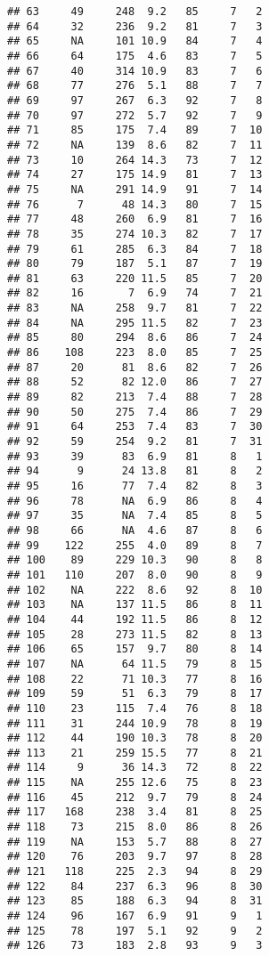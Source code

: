 \documentclass[
]{article}
\begin{document}
\begin{verbatim}
## 63     49     248  9.2   85     7   2
## 64     32     236  9.2   81     7   3
## 65     NA     101 10.9   84     7   4
## 66     64     175  4.6   83     7   5
## 67     40     314 10.9   83     7   6
## 68     77     276  5.1   88     7   7
## 69     97     267  6.3   92     7   8
## 70     97     272  5.7   92     7   9
## 71     85     175  7.4   89     7  10
## 72     NA     139  8.6   82     7  11
## 73     10     264 14.3   73     7  12
## 74     27     175 14.9   81     7  13
## 75     NA     291 14.9   91     7  14
## 76      7      48 14.3   80     7  15
## 77     48     260  6.9   81     7  16
## 78     35     274 10.3   82     7  17
## 79     61     285  6.3   84     7  18
## 80     79     187  5.1   87     7  19
## 81     63     220 11.5   85     7  20
## 82     16       7  6.9   74     7  21
## 83     NA     258  9.7   81     7  22
## 84     NA     295 11.5   82     7  23
## 85     80     294  8.6   86     7  24
## 86    108     223  8.0   85     7  25
## 87     20      81  8.6   82     7  26
## 88     52      82 12.0   86     7  27
## 89     82     213  7.4   88     7  28
## 90     50     275  7.4   86     7  29
## 91     64     253  7.4   83     7  30
## 92     59     254  9.2   81     7  31
## 93     39      83  6.9   81     8   1
## 94      9      24 13.8   81     8   2
## 95     16      77  7.4   82     8   3
## 96     78      NA  6.9   86     8   4
## 97     35      NA  7.4   85     8   5
## 98     66      NA  4.6   87     8   6
## 99    122     255  4.0   89     8   7
## 100    89     229 10.3   90     8   8
## 101   110     207  8.0   90     8   9
## 102    NA     222  8.6   92     8  10
## 103    NA     137 11.5   86     8  11
## 104    44     192 11.5   86     8  12
## 105    28     273 11.5   82     8  13
## 106    65     157  9.7   80     8  14
## 107    NA      64 11.5   79     8  15
## 108    22      71 10.3   77     8  16
## 109    59      51  6.3   79     8  17
## 110    23     115  7.4   76     8  18
## 111    31     244 10.9   78     8  19
## 112    44     190 10.3   78     8  20
## 113    21     259 15.5   77     8  21
## 114     9      36 14.3   72     8  22
## 115    NA     255 12.6   75     8  23
## 116    45     212  9.7   79     8  24
## 117   168     238  3.4   81     8  25
## 118    73     215  8.0   86     8  26
## 119    NA     153  5.7   88     8  27
## 120    76     203  9.7   97     8  28
## 121   118     225  2.3   94     8  29
## 122    84     237  6.3   96     8  30
## 123    85     188  6.3   94     8  31
## 124    96     167  6.9   91     9   1
## 125    78     197  5.1   92     9   2
## 126    73     183  2.8   93     9   3

\end{verbatim}
\end{document}
